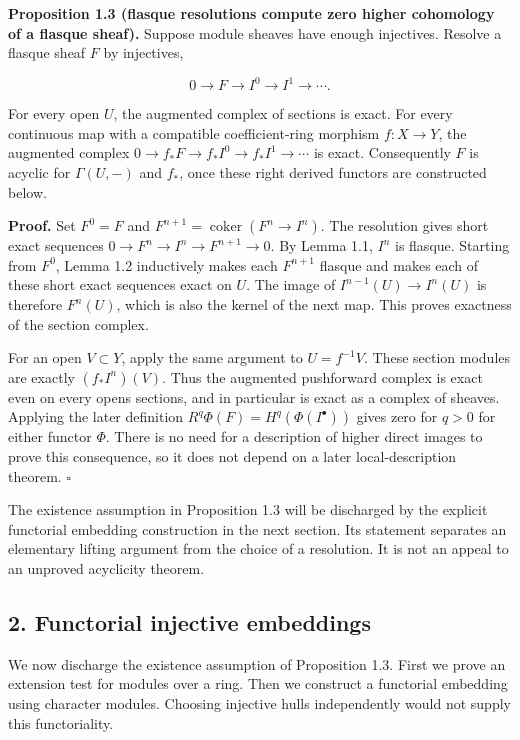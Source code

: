 \documentclass[
  english,
  11pt,
  a4paper,
]{article}
\begin{document}
\textbf{Proposition 1.3 (flasque resolutions compute zero higher
cohomology of a flasque sheaf).} Suppose module sheaves have enough
injectives. Resolve a flasque sheaf \(F\) by injectives,

\[0\longrightarrow F\longrightarrow I^0\longrightarrow I^1\longrightarrow\cdots.\]

For every open \(U\), the augmented complex of sections is exact. For
every continuous map with a compatible coefficient-ring morphism
\(f:X\to Y\), the augmented complex
\(0\to f_*F\to f_*I^0\to f_*I^1\to\cdots\) is exact. Consequently \(F\)
is acyclic for \(\Gamma(U,-)\) and \(f_*\), once these right derived
functors are constructed below.

\textbf{Proof.} Set \(F^0=F\) and
\(F^{n+1}=\operatorname{coker}(F^n\to I^n)\). The resolution gives short
exact sequences \(0\to F^n\to I^n\to F^{n+1}\to0\). By Lemma 1.1,
\(I^n\) is flasque. Starting from \(F^0\), Lemma 1.2 inductively makes
each \(F^{n+1}\) flasque and makes each of these short exact sequences
exact on \(U\). The image of \(I^{n-1}(U)\to I^n(U)\) is therefore
\(F^n(U)\), which is also the kernel of the next map. This proves
exactness of the section complex.

For an open \(V\subset Y\), apply the same argument to \(U=f^{-1}V\).
These section modules are exactly \((f_*I^n)(V)\). Thus the augmented
pushforward complex is exact even on every open\textquotesingle s
sections, and in particular is exact as a complex of sheaves. Applying
the later definition \(R^q\Phi(F)=H^q(\Phi(I^\bullet))\) gives zero for
\(q>0\) for either functor \(\Phi\). There is no need for a description
of higher direct images to prove this consequence, so it does not depend
on a later local-description theorem. \(\square\)

The existence assumption in Proposition 1.3 will be discharged by the
explicit functorial embedding construction in the next section. Its
statement separates an elementary lifting argument from the choice of a
resolution. It is not an appeal to an unproved acyclicity theorem.

\subsection{2. Functorial injective
embeddings}\label{injective-modules-and-bounded-below-derived-functors--2-functorial-injective-embeddings}

We now discharge the existence assumption of Proposition 1.3. First we
prove an extension test for modules over a ring. Then we construct a
functorial embedding using character modules. Choosing injective hulls
independently would not supply this functoriality.
\end{document}
